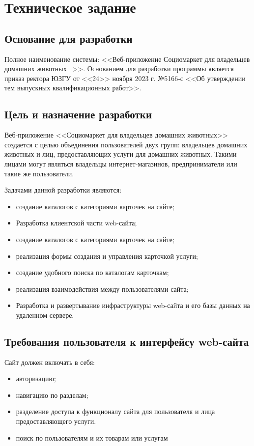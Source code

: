 \section{Техническое задание}
\subsection{Основание для разработки}

Полное наименование системы: <<Веб-приложение \textquotedbl Социомаркет для владельцев домашних животных \textquotedbl\ >>.
Основанием для разработки программы является приказ ректора ЮЗГУ от <<24>> ноября 2023 г. №5166-с <<Об утверждении тем выпускных квалификационных работ>>.

\subsection{Цель и назначение разработки}

Веб-приложение <<Социомаркет для владельцев домашних животных>> создается с целью объединения пользователей двух групп: владельцев домашних животных и лиц, предоставляющих услуги для домашних животных. Такими лицами могут являться владельцы интернет-магазинов, предприниматели или такие же пользователи.

Задачами данной разработки являются:
\begin{itemize}
\item создание каталогов с категориями карточек на сайте;
\item Разработка клиентской части web-сайта;
\item    создание каталогов с категориями карточек на сайте;
\item    реализация формы создания и управления карточкой услуги;
\item    создание удобного поиска по каталогам карточкам;
\item    реализация взаимодействия между пользователями сайта;
\item    Разработка и развертывание инфраструктуры web-сайта и его базы данных на удаленном сервере.
\end{itemize}

\subsection{Требования пользователя к интерфейсу web-сайта}

Сайт должен включать в себя:
\begin{itemize}
    \item авторизацию;
    \item навигацию по разделам;
    \item разделение доступа к функционалу сайта для пользователя и лица предоставляющего услуги.
    \item поиск по пользователям и их товарам или услугам
\end{itemize}


